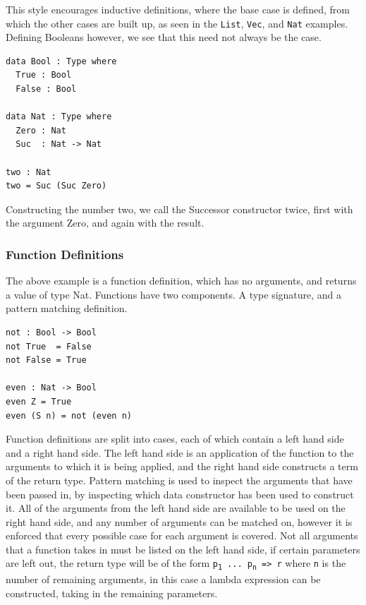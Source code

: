 \documentclass[a4paper]{article}
\begin{document}
This style encourages inductive definitions, where the base case is 
defined, from which the other cases are built up, as seen in the \texttt{List},
\texttt{Vec}, and \texttt{Nat} examples. Defining Booleans however, we see that this
need not always be the case. 

\begin{center}
\begin{verbatim}
data Bool : Type where
  True : Bool
  False : Bool

data Nat : Type where
  Zero : Nat
  Suc  : Nat -> Nat

two : Nat
two = Suc (Suc Zero)
\end{verbatim}
\end{center}

Constructing the number two, we call the Successor constructor twice, first with the argument Zero,
and again with the result.

\subsubsection{Function Definitions}
\label{sec:org19c74b8}
The above example is a function definition, which has no arguments,
and returns a value of type Nat. Functions have two components. 
A type signature, and a pattern matching definition.

\begin{center}
\begin{verbatim}
not : Bool -> Bool
not True  = False
not False = True

even : Nat -> Bool
even Z = True
even (S n) = not (even n) 
\end{verbatim}
\end{center}

Function definitions are split into cases, each of which contain 
a left hand side and a right hand side.
The left hand side is an application of the function to the arguments
to which it is being applied, and the right hand side constructs a term
of the return type. Pattern matching is used to inspect the arguments
that have been passed in, by inspecting which data constructor has been
used to construct it. All of the arguments from the left hand side are
available to be used on the right hand side, and any number of arguments
can be matched on, however it is enforced that every possible case for 
each argument is covered. Not all arguments that a function takes in 
must be listed on the left hand side, if certain parameters are left out,
the return type will be of the form \texttt{p\textsubscript{1} ... p\textsubscript{n} => r} where \texttt{n} is the 
number of remaining arguments, in this case a lambda expression can be 
constructed, taking in the remaining parameters. 
\end{document}
